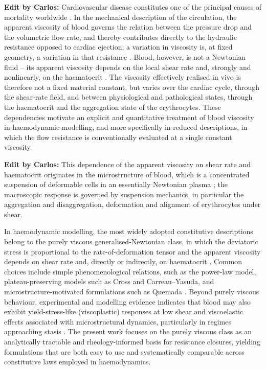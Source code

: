 \documentclass[lineno]{jfm}
\newcommand{\cbp}[1]{{\color{blue} \textbf{Edit by Carlos:} #1}}
\begin{document}
\cbp{Cardiovascular disease constitutes one of the principal causes of mortality worldwide \citep{Roth2020GBD}. In the mechanical description of the circulation, the apparent viscosity of blood governs the relation between the pressure drop and the volumetric flow rate, and thereby contributes directly to the hydraulic resistance opposed to cardiac ejection; a variation in viscosity is, at fixed geometry, a variation in that resistance \citep{Chien1987,Mozos2015}. Blood, however, is not a Newtonian fluid -- its apparent viscosity depends on the local shear rate and, strongly and nonlinearly, on the haematocrit \citep{Chien1987,Nader2019}. The viscosity effectively realised in vivo is therefore not a fixed material constant, but varies over the cardiac cycle, through the shear-rate field, and between physiological and pathological states, through the haematocrit and the aggregation state of the erythrocytes. These dependencies motivate an explicit and quantitative treatment of blood viscosity in haemodynamic modelling, and more specifically in reduced descriptions, in which the flow resistance is conventionally evaluated at a single constant viscosity.}


\cbp{This dependence of the apparent viscosity on shear rate and haematocrit originates in the microstructure of blood, which is a concentrated suspension of deformable cells in an essentially Newtonian plasma \citep{FORMAGGIA-SPRINGER,Sequeria2018}; the macroscopic response is governed by suspension mechanics, in particular the aggregation and disaggregation, deformation and alignment of erythrocytes under shear.}

In haemodynamic modelling, the most widely adopted constitutive descriptions belong to the purely viscous generalised-Newtonian class, in which the deviatoric stress is proportional to the rate-of-deformation tensor and the apparent viscosity depends on shear rate and, directly or indirectly, on haematocrit \citep{FORMAGGIA-SPRINGER,Sequeria2018,Quemada1977,Popel2005}. Common choices include simple phenomenological relations, such as the power-law model, plateau-preserving models such as Cross and Carreau--Yasuda, and microstructure-motivated formulations such as Quemada \citep{Quemada1977,Popel2005,Neofytou2004,Mimouni2016}. Beyond purely viscous behaviour, experimental and modelling evidence indicates that blood may also exhibit yield-stress-like (viscoplastic) responses at low shear and viscoelastic effects associated with microstructural dynamics, particularly in regimes approaching stasis \citep{leuprecht2001computer}. The present work focuses on the purely viscous class as an analytically tractable and rheology-informed basis for resistance closures, yielding formulations that are both easy to use and systematically comparable across constitutive laws employed in haemodynamics.
\end{document}
